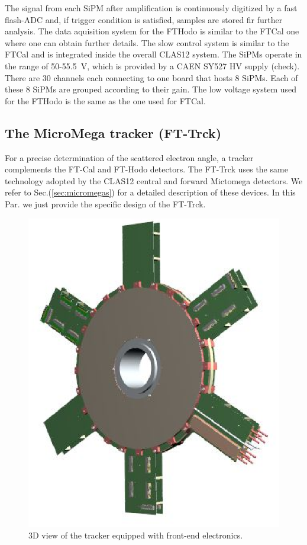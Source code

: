 The signal from each SiPM after amplification is continuously digitized by a fast flash-ADC and, if trigger condition is satisfied, samples are stored fir further analysis. The data aquisition system for the FTHodo is similar to the FTCal one where one can obtain further details. The slow control system is similar to the FTCal and is integrated inside the overall CLAS12 system. The SiPMs operate in the range of 50-55.5~V, which is provided by a CAEN SY527 HV supply (check). There are 30 channels each connecting to one board that hosts 8 SiPMs. Each of these 8 SiPMs are grouped according to their gain. The low voltage system used for the FTHodo is the same as the one used for FTCal.


\subsection{The MicroMega tracker (FT-Trck)}
For a precise determination of the scattered electron angle, a tracker  complements the FT-Cal and FT-Hodo detectors. The FT-Trck uses the same technology adopted by the CLAS12 central and forward Mictomega detectors. We refer to Sec.(\ref{sec:micromegas}) for a detailed description of  these devices. In this Par. we just provide the specific design of the FT-Trck.
\begin{figure}[th!]
\centering 
\includegraphics[width=1.0\columnwidth]{./fig/FTtrck.eps}
\caption{3D view of the tracker equipped with front-end electronics.}
\label{fig:ft-trck} 
\end{figure}


